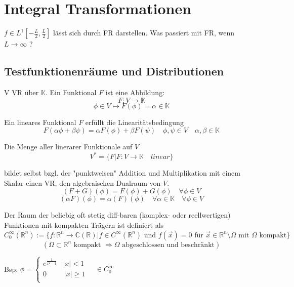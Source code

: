 \section{Integral Transformationen}
    $f \in L^1[-\frac{L}{2}, \frac{L}{2}]$ lässt sich durch
    FR darstellen. Was passiert mit FR, wenn 
    $L \rightarrow \infty$ ?


    \subsection{Testfunktionenräume und Distributionen}

    \begin{Def}
        V VR über $\mathbb{K}$. Ein Funktional $F$ ist eine Abbildung:
        $$F: V \rightarrow \mathbb{K}$$
        $$ \phi \in V \mapsto F(\phi) = \alpha \in \mathbb{K}$$

        Ein lineares Funktional $F$ erfüllt die Linearitätsbedingung
        $$F(\alpha \phi + \beta \psi) = \alpha F(\phi) + \beta F(\psi) \quad \phi , \psi \in V \quad \alpha, \beta \in \mathbb{K} $$

        Die Menge aller linerarer Funktionale auf $V$
        $$V^\ast =  \{ F | F:V \rightarrow \mathbb{K} \quad linear \} $$

        bildet selbst bzgl. der "punktweisen" Addition und Multiplikation
        mit einem Skalar einen VR, den algebraischen Dualraum von $V$.
        $$(F+G)(\phi) = F(\phi) + G(\phi) \quad \forall \phi \in V $$
        $$(\alpha F)(\phi) = \alpha (F)(\phi)  \quad \forall \alpha \in \mathbb{K} \quad \forall \phi \in V $$
    \end{Def}

    \begin{Def}
        Der Raum der beliebig oft stetig diff-baren (komplex- oder 
        reellwertigen) Funktionen mit kompakten Trägern ist definiert als
        $$C_0^\infty (\mathbb{R}^n)  := \{ f:\mathbb{R}^n \rightarrow \mathbb{C}(\mathbb{R}) | f \in C^\infty(\mathbb{R}^n) \textrm{ und } f(\vec{x})=0 \textrm{ für } \vec{x} \in \mathbb{R}^n \setminus  \Omega \textrm{ mit } \Omega \textrm{ kompakt} \}$$
        $$( \Omega \subset \mathbb{R}^n \textrm{ kompakt } \Rightarrow \Omega \textrm{ abgeschlossen und beschränkt} )$$

        Bsp: $\phi = \left\{ \begin{array}{ll}
            e^{\frac{1}{x^2-1}} & |x| < 1 \\
            0 & \, |x| \geq 1 \\
            \end{array}
            \right. \quad \in C_0^{\infty} $
    \end{Def}

